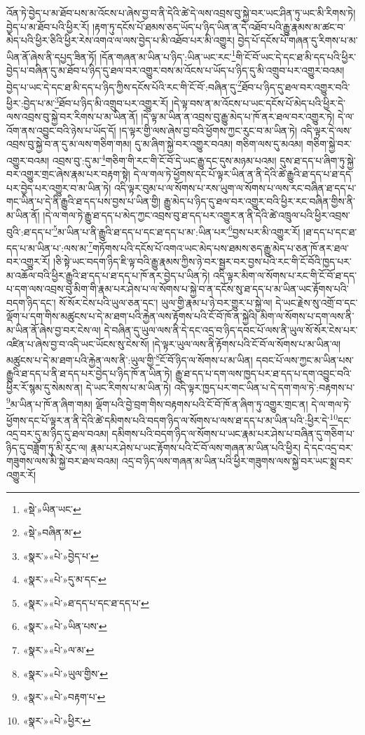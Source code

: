 འོན་ཏེ་བྱེད་པ་མ་ཐོབ་པས་མ་འོངས་པ་ཞེས་བྱ་བ་ནི་དེའི་ཚེ་དེ་ལས་འབྲས་བུ་སྐྱེ་བར་ཡང་ཤིན་ཏུ་ཡང་མི་རིགས་ཏེ། བྱེད་པ་མ་ཐོབ་པའི་ཕྱིར་རོ། །རྟག་ཏུ་དངོས་པོ་ཐམས་ཅད་ཡོད་པ་ཉིད་ཡིན་ན་དེ་འཐོབ་པའི་རྒྱུ་རྣམས་མ་ཚང་བ་མེད་པའི་ཕྱིར་ཅིའི་ཕྱིར་རེས་འགའ་ལ་ལས་བྱེད་པ་མི་འཐོབ་པར་མི་འགྱུར། བྱེད་པོ་དངོས་པོ་གཞན་དུ་རིགས་པ་མ་ཡིན་ནོ་ཞེས་ནི་དཔྱད་ཟིན་ཏོ། །དོན་གཞན་མ་ཡིན་པ་ཉིད་:ཡིན་ཡང་རང་\footnote{«སྡེ་»ཡིན་ཡང་}གི་ངོ་བོ་ཡང་དེ་དང་ཐ་མི་དད་པའི་ཕྱིར་བྱེད་པ་བཞིན་དུ་མ་ཐོབ་པ་ཉིད་དུ་ཐལ་བར་འགྱུར་བས་མ་འོངས་པ་ཡོད་པ་ཉིད་དུ་མི་འགྲུབ་པར་འགྱུར་བའམ། བྱེད་པ་ཡང་དེ་དང་ཐ་མི་དད་པ་ཉིད་ཀྱིས་དངོས་པོའི་རང་གི་ངོ་བོ་:བཞིན་དུ་\footnote{«སྡེ་»བཞིན་མ་}ཐོབ་པ་ཉིད་དུ་ཐལ་བར་འགྱུར་བའི་ཕྱིར་:བྱེད་པ་མ་\footnote{«སྣར་»«པེ་»བྱེད་པ་}ཐོབ་པ་ཉིད་མི་འགྲུབ་པར་འགྱུར་རོ། །དེ་ལྟ་བས་ན་མ་འོངས་པ་ཡང་དངོས་པོ་མེད་པའི་ཕྱིར་དེ་ལས་འབྲས་བུ་སྐྱེ་བར་རིགས་པ་མ་ཡིན་ནོ། །དེ་ལྟ་མ་ཡིན་ན་འབྲས་བུ་རྒྱུ་མེད་པ་ཁོ་ནར་ཐལ་བར་འགྱུར་ཏེ། དེ་ལ་འོག་ནས་འབྱུང་བའི་ཉེས་པ་ཡོད་དོ། །ད་ལྟར་གྱི་ལས་ཞེས་བྱ་བའི་ཕྱོགས་ཀྱང་རུང་བ་མ་ཡིན་ཏེ། འདི་ལྟར་དེ་ལས་འབྲས་བུ་སྐྱེ་བ་ན་དུ་མ་ལས་གཅིག་གམ། དུ་མ་ཞིག་སྐྱེ་བར་འགྱུར་བའམ། གཅིག་ལས་དུ་མའམ། གཅིག་སྐྱེ་བར་འགྱུར་བའམ། འབྲས་བུ་:དུ་མ་\footnote{«སྣར་»«པེ་»དུ་མ་དང་}གཅིག་གི་རང་གི་ངོ་བོ་དེ་ཡང་རྒྱུ་དང་དུས་མཉམ་པའམ། དུས་ཐ་དད་པ་ཞིག་ཏུ་སྐྱེ་བར་འགྱུར་གྲང་ཞེས་རྣམ་པར་བརྟག་སྟེ། དེ་ལ་གལ་ཏེ་ཕྱོགས་དང་པོ་ལྟར་ཡིན་ན་ནི་དེའི་ཚེ་རྒྱུའི་ཐ་དད་པ་ཐ་དད་པར་བྱེད་པར་འགྱུར་བ་མ་ཡིན་ཏེ། འདི་ལྟར་བུམ་པ་ལ་སོགས་པ་རས་ཡུག་ལ་སོགས་པ་ལས་རང་བཞིན་ཐ་དད་པ་གང་ཡིན་པ་དེ་ནི་རྒྱུའི་ཐ་དད་པས་བྱས་པ་ཡིན་གྱི། རྒྱུ་མེད་པ་ཉིད་དུ་ཐལ་བར་འགྱུར་བའི་ཕྱིར་རང་བཞིན་གྱིས་ནི་མ་ཡིན་ནོ། །དེ་ལ་གལ་ཏེ་རྒྱུ་ཐ་དད་པ་མེད་ཀྱང་འབྲས་བུ་ཐ་དད་པར་འགྱུར་ན་ནི་དེའི་ཚེ་འཁྲུལ་པའི་ཕྱིར་འབྲས་བུའི་:ཐ་དད་པ་\footnote{«སྣར་»«པེ་»ཐ་དད་པ་དང་ཐ་དད་པ་}མ་ཡིན་པ་ནི་རྒྱུའི་ཐ་དད་པ་དང་ཐ་དད་པ་མ་:ཡིན་པར་\footnote{«སྣར་»«པེ་»ཡིན་པས་}བྱས་པར་མི་འགྱུར་རོ། །ཐ་དད་པ་དང་ཐ་དད་པ་མ་ཡིན་པ་:ལས་མ་\footnote{«སྣར་»«པེ་»ལ་མ་}གཏོགས་པའི་དངོས་པོ་འགའ་ཡང་མེད་པས་ཐམས་ཅད་རྒྱུ་མེད་པ་ཅན་ཁོ་ནར་ཐལ་བར་འགྱུར་རོ། །ཅི་སྟེ་ཡང་བདག་ཉིད་ཇི་ལྟ་བའི་རྒྱུ་རྣམས་ཀྱིས་ཉེ་བར་སྦྱར་བར་བྱས་པའི་རང་གི་ངོ་བོའི་ཁྱད་པར་མ་འཆོལ་བའི་ཕྱིར་རྒྱུའི་ཐ་དད་པ་ཐ་དད་པ་ཁོ་ནར་བྱེད་པ་ཡིན་ཏེ། འདི་ལྟར་མིག་ལ་སོགས་པ་རང་གི་ངོ་བོ་ཐ་དད་པ་དག་ལས་འབྲས་བུ་མིག་གི་རྣམ་པར་ཤེས་པ་ལ་སོགས་པ་སྐྱེ་བ་ན་དངོས་སུ་ཐ་དད་པ་མ་ཡིན་ཡང་རྟོགས་པའི་བདག་ཉིད་དང་། སོ་སོར་ངེས་པའི་ཡུལ་ཅན་དང་། ཡུལ་གྱི་རྣམ་པ་ཉེ་བར་གྱུར་པ་སྐྱེ་ལ། དེ་ཡང་རྗེས་སུ་འགྲོ་བ་དང་ལྡོག་པ་དག་གིས་མཚུངས་པ་དེ་མ་ཐག་པའི་རྐྱེན་ལས་རྟོགས་པའི་ངོ་བོ་ཁོ་ན་སྐྱེའི། མིག་ལ་སོགས་པ་དག་ལས་ནི་མ་ཡིན་ནོ་ཞེས་བྱ་བར་ངེས་ལ། དེ་བཞིན་དུ་ཡུལ་ལས་ནི་དེ་དང་འདྲ་བ་ཉིད་དབང་པོ་ལས་ནི་ཡུལ་སོ་སོར་ངེས་པར་འཛིན་པ་ཞེས་བྱ་བ་འདི་ཡང་ཡོངས་སུ་ངེས་སོ། །དེ་ལྟར་ཡུལ་ལས་ནི་རྟོགས་པའི་ངོ་བོ་ལ་སོགས་པ་མ་ཡིན་ལ། མཚུངས་པ་དེ་མ་ཐག་པའི་རྐྱེན་ལས་ནི་:ཡུལ་གྱི་\footnote{«སྣར་»«པེ་»ཡུལ་གྱིས་}ངོ་བོ་ཉིད་ལ་སོགས་པ་མ་ཡིན། དབང་པོ་ལས་ཀྱང་མ་ཡིན་པས་རྒྱུའི་ཐ་དད་པ་ནི་ཐ་དད་པར་བྱེད་པ་ཉིད་ཁོ་ན་ཡིན་ཏེ། རྒྱུ་ཐ་དད་པ་དག་ལས་ཁྱད་པར་ཐ་དད་པ་དག་འབྱུང་བའི་ཕྱིར་རོ་སྙམ་དུ་སེམས་ན། དེ་ཡང་རིགས་པ་མ་ཡིན་ཏེ། འདི་ལྟར་ཁྱད་པར་གང་ཡིན་པ་དེ་དག་གལ་ཏེ་:བརྟགས་པ་\footnote{«སྣར་»«པེ་»བརྟག་པ་}མ་ཡིན་པ་ཁོ་ན་ཞིག་གམ། ལྡོག་པའི་བྱེ་བྲག་གིས་བརྟགས་པའི་ངོ་བོ་ཁོ་ན་ཞིག་ཏུ་འགྱུར་གྲང་ན། དེ་ལ་གལ་ཏེ་ཕྱོགས་དང་པོ་ལྟར་ན་ནི་དེའི་ཚེ་དམིགས་པའི་བདག་ཉིད་ལ་སོགས་པ་ལས་ཐ་དད་པ་མ་ཡིན་པའི་:ཕྱིར་དེ་\footnote{«སྣར་»«པེ་»ཕྱིར་}དང་འདྲ་བར་དུ་མ་ཉིད་དུ་ཐལ་བའམ། དམིགས་པའི་བདག་ཉིད་ལ་སོགས་པ་ཡང་རྣམ་པར་ཤེས་པ་བཞིན་དུ་གཅིག་པ་ཉིད་དུ་བཟློག་ཏུ་མི་རུང་ལ། རྣམ་པར་ཤེས་པ་ཡང་རྟོགས་པའི་ངོ་བོ་ལས་གཞན་མ་ཡིན་པའི་ཕྱིར། དེ་དང་འདྲ་བར་གཟུགས་ལས་མི་སྐྱེ་བར་ཐལ་བའམ། འདྲ་བ་ཉིད་ལས་གཞན་མ་ཡིན་པའི་ཕྱིར་གཟུགས་ལས་སྐྱེ་བར་ཡང་སྨྲ་བར་འགྱུར་རོ། 